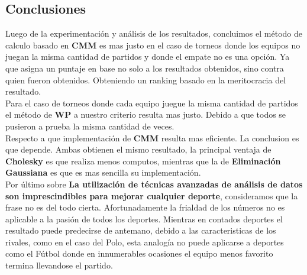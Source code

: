 \subsection{Conclusiones}


Luego de la experimentación y análisis de los resultados, concluimos el método de calculo basado en \textbf{CMM} es mas justo en el 
caso de torneos donde los equipos no juegan la misma cantidad de partidos y donde el empate no es una opción. Ya que asigna un puntaje 
en base no solo a los resultados obtenidos, sino contra quien fueron obtenidos. Obteniendo un ranking basado en la meritocracia del resultado. \\

Para el caso de torneos donde cada equipo juegue la misma cantidad de partidos el método de \textbf{WP} a nuestro criterio resulta mas justo. 
Debido a que todos se pusieron a prueba la misma cantidad de veces. \\

Respecto a que implementación de \textbf{CMM} resulta mas eficiente. La conclusion es que depende. Ambas obtienen el mismo resultado, 
la principal ventaja de \textbf{Cholesky} es que realiza menos computos, mientras que la de \textbf{Eliminación Gaussiana} es que es mas 
sencilla su implementación. \\

Por último sobre \textbf{La utilización de técnicas avanzadas de análisis de datos son imprescindibles para mejorar cualquier deporte}, 
consideramos que la frase no es del todo cierta. Afortunadamente la frialdad de los números no es aplicable a la pasión de todos los deportes. 
Mientras en contados deportes el resultado puede predecirse de antemano, debido a las caracteristicas de los rivales, como en el caso del Polo, 
esta analogía no puede aplicarse a deportes como el Fútbol donde en innumerables ocasiones el equipo menos favorito termina llevandose el partido.
